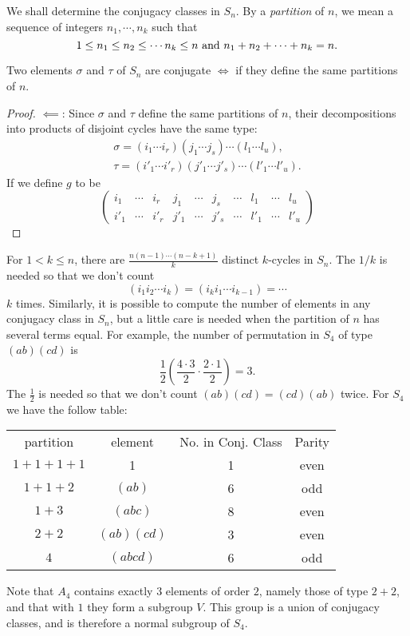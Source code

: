 We shall determine the conjugacy classes in \( S_n \).
By a \emph{partition} of \( n \), we mean a sequence of integers \( n_1, \cdots, n_k \) such that
\[
  1 \leq n_1 \leq n_2 \leq \cdots n_k \leq n \textmd{ and } n_1 + n_2 + \cdots + n_k = n.
\]
\begin{proposition}
  Two elements \( \sigma \) and \( \tau \) of \( S_n \) are conjugate \( \iff \) if they define the same partitions of \( n \).
\end{proposition}
\begin{proof}
  \( \impliedby \): Since \( \sigma \) and \( \tau \) define the same partitions of \( n \), their decompositions into products of disjoint cycles have the same type:
  \begin{align*}
    \sigma = (i_1 \cdots i_r)(j_1 \cdots j_s)\cdots(l_1 \cdots l_u),\\
    \tau = (i'_1 \cdots i'_r)(j'_1 \cdots j'_s)\cdots(l'_1 \cdots l'_u).
  \end{align*}
  If we define \( g \) to be
  \[
    \begin{pmatrix}
      i_1 &\cdots &i_r &j_1 &\cdots &j_s &\cdots &l_1 &\cdots &l_u\\
      i'_1 &\cdots &i'_r &j'_1 &\cdots &j'_s &\cdots &l'_1 &\cdots &l'_u
    \end{pmatrix}
  \]
\end{proof}
\begin{remark}
  For \( 1 < k \leq n \), there are \( \frac{n(n - 1) \cdots (n - k + 1)}{k} \) distinct \( k \)-cycles in \( S_n \).
  The \( 1 / k \) is needed so that we don't count
  \[
    (i_1 i_2 \cdots i_k) = (i_k i_1 \cdots i_{k - 1}) = \cdots
  \]
  \( k \) times.
  Similarly, it is possible to compute the number of elements in any conjugacy class in \( S_n \), but a little care is needed when the partition of \( n \) has several terms equal.
  For example, the number of permutation in \( S_4 \) of type \( (ab)(cd) \) is
  \[
    \frac{1}{2}\left(\frac{4 \cdot 3}{2} \cdot \frac{2 \cdot 1}{2}\right) = 3.
  \]
  The \( \frac{1}{2} \) is needed so that we don't count \( (ab)(cd) = (cd)(ab) \) twice.
  For \( S_4 \) we have the follow table:
  \begin{table}[H]
    \centering
    \begin{tabular}{cccc}
      partition & element & No. in Conj. Class & Parity\\
      \( 1 + 1 + 1 + 1 \) & 1 & 1 & even\\
      \( 1 + 1 + 2 \) & \( (ab) \) & 6 & odd\\
      \( 1 + 3 \) & \( (abc) \) & 8 & even\\
      \( 2 + 2 \) & \( (ab)(cd) \) & 3 & even\\
      \( 4 \) & \( (abcd) \) & 6 & odd
    \end{tabular}
  \end{table}
  Note that \( A_4 \) contains exactly \( 3 \) elements of order \( 2 \), namely those of type \( 2 + 2 \), and that with \( 1 \) they form a subgroup \( V \).
  This group is a union of conjugacy classes, and is therefore a normal subgroup of \( S_4 \).
\end{remark}

